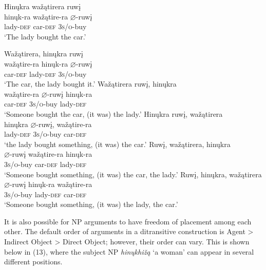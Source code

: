 \documentclass[output=paper]{LSP/langsci}
\begin{document}
\begin{exe}
\ex 
\glll Hin\k{u}kra wa\v{z}ątirera ruw\k{i}  \\
hin\k{u}k-ra	wa\v{z}ątire-ra 	$\varnothing$-ruw\k{i} \\
lady-\textsc{def}	car-\textsc{def}	 \textsc{3s/o}-buy \\
\trans `The lady bought the car.'
\ex
\begin{xlist}
\ex	
\glll Wa\v{z}ątirera,	hin\k{u}kra		ruw\k{i} \\
wa\v{z}ątire-ra 	hin\k{u}k-ra		$\varnothing$-ruw\k{i} \\
car-\textsc{def}			lady-\textsc{def}		\textsc{3s/o}-buy \\
\trans `The car, the lady bought it.'
\ex  
\glll Wa\v{z}ątirera		ruw\k{i},			hin\k{u}kra\\
wa\v{z}ątire-ra	$\varnothing$-ruw\k{i}	hin\k{u}k-ra \\
car-\textsc{def} 			\textsc{3s/o}-buy 	lady-\textsc{def} \\
\trans `Someone bought the car, (it was) the lady.'
\ex 
\glll Hin\k{u}kra 		ruw\k{i}, 		wa\v{z}ątirera \\
hin\k{u}kra 	$\varnothing$-ruw\k{i}, 		wa\v{z}ątire-ra \\
lady-\textsc{def} \textsc{3s/o}-buy car-\textsc{def} \\
\trans `the lady bought something, (it was) the car.'
\ex 
\glll Ruw\k{i}, 		wa\v{z}ątirera,	hin\k{u}kra\\
$\varnothing$-ruw\k{i}	wa\v{z}ątire-ra	hin\k{u}k-ra \\
\textsc{3s/o}-buy car-\textsc{def} lady-\textsc{def} \\
\trans `Someone bought something, (it was) the car, the lady.'
\ex 
\glll Ruw\k{i}, 		hin\k{u}kra, 	wa\v{z}ątirera \\
$\varnothing$-ruw\k{i} 	hin\k{u}k-ra 	wa\v{z}ątire-ra \\ 
\textsc{3s/o}-buy lady-\textsc{def} car-\textsc{def} \\
\trans `Someone bought something, (it was) the lady, the car.'
\end{xlist}
\end{exe}

It is also possible for NP arguments to have freedom of placement among each other. The default order of arguments in a ditransitive construction is Agent > Indirect Object > Direct Object; however, their order can vary.  This is shown below in (13), where the subject NP \textit{hin\k{u}khi\v{z}ą} `a woman' can appear in several different positions.
\end{document}
